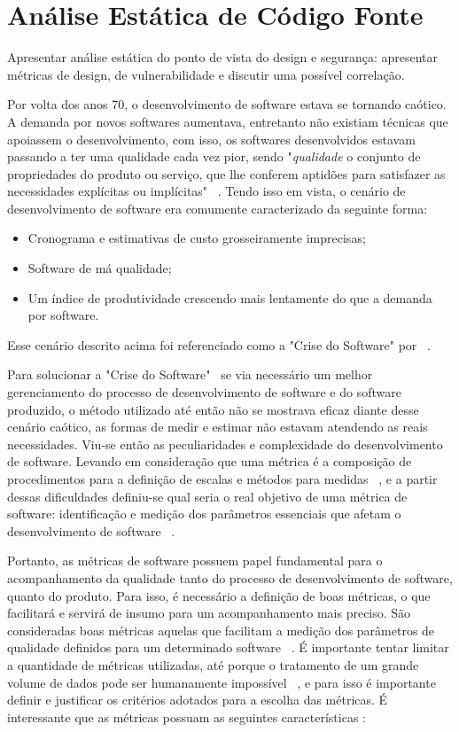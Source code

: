\chapter{Análise Estática de Código Fonte} \label{chap:metricas}

Apresentar análise estática do ponto de vista do design e segurança:
apresentar métricas de design, de vulnerabilidade e discutir uma possível
correlação.

Por volta dos anos 70, o desenvolvimento de software estava se tornando caótico. A demanda por novos softwares aumentava,
entretanto não existiam técnicas que apoiassem o desenvolvimento, com isso, os softwares desenvolvidos estavam passando
a ter uma qualidade cada vez pior, sendo "\emph{qualidade} o conjunto de propriedades do produto ou serviço, que lhe conferem 
aptidões para satisfazer as necessidades explícitas ou implícitas" ~\cite{iso:8402}. Tendo isso em vista, o cenário de
desenvolvimento de software era comumente caracterizado da seguinte forma:

\begin{itemize}
  \item Cronograma e estimativas de custo grosseiramente imprecisas;
  \item Software de má qualidade;
  \item Um índice de produtividade crescendo mais lentamente do que a demanda por software.
\end{itemize}

Esse cenário descrito acima foi referenciado como a "Crise do Software" por
~.

Para solucionar a "Crise do Software" ~se via necessário um melhor gerenciamento do processo de desenvolvimento de software
e do software produzido, o método utilizado até então não se mostrava eficaz diante desse cenário caótico, as formas de medir 
e estimar não estavam atendendo as reais necessidades. Viu-se então as peculiaridades e complexidade do desenvolvimento de 
software. Levando em consideração que uma métrica é a composição de procedimentos para a definição de escalas e métodos para 
medidas ~\cite{iso:9126-1}, e a partir dessas dificuldades definiu-se qual seria o real objetivo de uma métrica de software: 
identificação e medição dos parâmetros essenciais que afetam o desenvolvimento de software ~\cite{mills88}.

Portanto, as métricas de software possuem papel fundamental para o acompanhamento da qualidade tanto do processo de
desenvolvimento de software, quanto do produto. Para isso, é necessário a definição de boas métricas, o que facilitará
e servirá de insumo para um acompanhamento mais preciso. São consideradas boas métricas aquelas que facilitam a medição dos 
parâmetros de qualidade definidos para um determinado software ~\cite{mills88}. É importante tentar limitar a quantidade
de métricas utilizadas, até porque o tratamento de um grande volume de dados pode ser humanamente impossível 
~\cite{meirelles2013}, e para isso é importante definir e justificar os critérios adotados para a escolha das métricas.
É interessante que as métricas possuam as seguintes características \cite{fenton&pfleenger98,mills88}:

